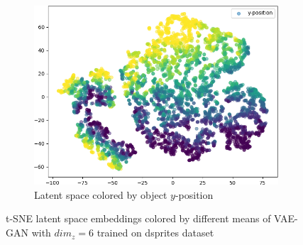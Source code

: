 \documentclass[11pt]{article}
\begin{document}
\begin{figure}[H]
\begin{subfigure}{.19\textwidth}
\includegraphics[width=\textwidth]{images/latent_spaces/dsprites/vae_gan/embeddings_mu_4.png}
\caption{Latent space colored by object $y$-position}
\end{subfigure}
\caption[\ac{VAE}-\ac{GAN} Latent Space - dsprites]{\ac{t-SNE} latent space embeddings colored by different means of \ac{VAE}-\ac{GAN} with $dim_z=6$ trained on dsprites dataset}
\label{fig:vae_gan_latent_space_dsprites}
\end{figure}
\end{document}
